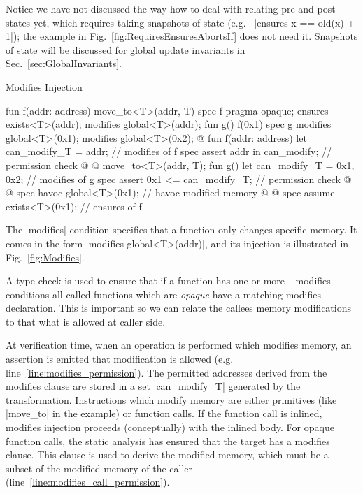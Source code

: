 Notice we have not discussed the way how to deal with relating pre and post
states yet, which requires taking snapshots of state (e.g.~%
|ensures x == old(x) + 1|); the example in
Fig.~\ref{fig:RequiresEnsuresAbortsIf} does not need it. Snapshots of state
will be discussed for global update invariants in Sec.~\ref{sec:GlobalInvariants}.


\begin{Figure}
  \caption{Modifies Injection}
  \label{fig:Modifies}
  \centering
\begin{MoveBox}
  fun f(addr: address) { move_to<T>(addr, T{}) }
  spec f {
    pragma opaque;
    ensures exists<T>(addr);
    modifies global<T>(addr);
  }
  fun g() { f(0x1) }
  spec g {
    modifies global<T>(0x1); modifies global<T>(0x2);
  }
  @\transform@
  fun f(addr: address) {
    let can_modify_T = {addr};      // modifies of f
    spec assert addr in can_modify; // permission check @%
                                            \label{line:modifies_permission}@
    move_to<T>(addr, T{});
  }
  fun g() {
    let can_modify_T = {0x1, 0x2};  // modifies of g
    spec assert {0x1} <= can_modify_T; // permission check @%
                                            \label{line:modifies_call_permission}@
    spec havoc global<T>(0x1);      // havoc modified memory @%
                                            \label{line:modifies_havoc}@
    spec assume exists<T>(0x1);     // ensures of f
  }
\end{MoveBox}
\end{Figure}


The |modifies| condition specifies that a function only changes specific memory.
It comes in the form |modifies global<T>(addr)|, and its injection is
illustrated in Fig.~\ref{fig:Modifies}.

A type check is used to ensure that if a function has one or more~%
|modifies| conditions all called functions which are \emph{opaque} have a matching
modifies declaration. This is important so we can relate the callees
memory modifications to that what is allowed at caller side.

At verification time, when an operation is performed which modifies memory, an
assertion is emitted that modification is allowed
(e.g. line~\ref{line:modifies_permission}). The permitted addresses derived from
the modifies clause are stored in a set |can_modify_T| generated by the
transformation. Instructions which modify memory are either primitives (like
|move_to| in the example) or function calls. If the function call is inlined,
modifies injection proceeds (conceptually) with the inlined body. For opaque
function calls, the static analysis has ensured that the target has a modifies
clause.  This clause is used to derive the modified memory, which must be a
subset of the modified memory of the caller
(line~\ref{line:modifies_call_permission}).

